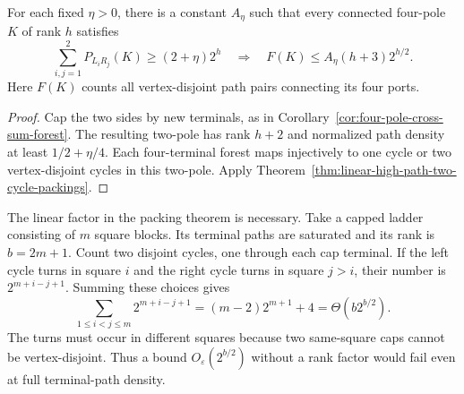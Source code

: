 \begin{corollary}
\label{cor:linear-four-pole-cross-sum-forest}
For each fixed $\eta>0$, there is a constant $A_\eta$ such that every connected four-pole $K$ of rank $h$ satisfies
\[
 \sum_{i,j=1}^2P_{L_iR_j}(K)\ge(2+\eta)2^h
 \quad\Longrightarrow\quad
 F(K)\le A_\eta(h+3)2^{h/2}.
\]
Here $F(K)$ counts all vertex-disjoint path pairs connecting its four ports.
\end{corollary}

\begin{proof}
Cap the two sides by new terminals, as in Corollary~\ref{cor:four-pole-cross-sum-forest}.
The resulting two-pole has rank $h+2$ and normalized path density at least $1/2+\eta/4$.
Each four-terminal forest maps injectively to one cycle or two vertex-disjoint cycles in this two-pole.
Apply Theorem~\ref{thm:linear-high-path-two-cycle-packings}.
\end{proof}

The linear factor in the packing theorem is necessary.
Take a capped ladder consisting of $m$ square blocks.
Its terminal paths are saturated and its rank is $b=2m+1$.
Count two disjoint cycles, one through each cap terminal.
If the left cycle turns in square $i$ and the right cycle turns in square $j>i$, their number is $2^{m+i-j+1}$.
Summing these choices gives
\[
 \sum_{1\le i<j\le m}2^{m+i-j+1}
 =(m-2)2^{m+1}+4
 =\Theta(b2^{b/2}).
\]
The turns must occur in different squares because two same-square caps cannot be vertex-disjoint.
Thus a bound $O_\varepsilon(2^{b/2})$ without a rank factor would fail even at full terminal-path density.
